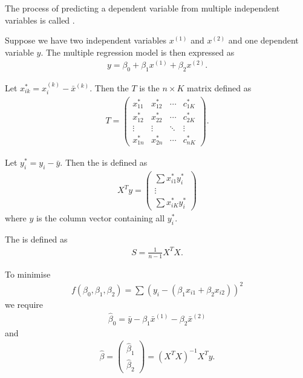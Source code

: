 \documentclass{article}
\begin{document}
\begin{definition}
	The process of predicting a dependent variable from multiple independent variables is called .
\end{definition}
\begin{definition}
	Suppose we have two independent variables $x^{(1)}$ and $x^{(2)}$ and one dependent variable $y$.
	The multiple regression model is then expressed as
	\begin{align*}
		y = \beta_0 + \beta_1 x^{(1)} + \beta_2 x^{(2)}.
	\end{align*}
\end{definition}
\begin{definition}
	Let $x^*_{ik}=x^{(k)}_i - \bar x^{(k)}$. Then the  $T$ is
	the $n\times K$ matrix defined as
	\begin{align*}
		T = \begin{pmatrix}
			x^*_{11} & x^*_{12} & \cdots & c^*_{1K}\\
			x^*_{12} & x^*_{22} & \cdots & c^*_{2K}\\
			\vdots & \vdots & \ddots & \vdots\\
			x^*_{1n} & x^*_{2n} &\cdots & c^*_{nK}
		\end{pmatrix}.
	\end{align*}
\end{definition}
\begin{definition}
	Let $y^*_i=y_i-\bar y$. Then the  is defined as
	\begin{align*}
		X^T y = \begin{pmatrix}
			\sum x^*_{i1} y^*_i\\
			\vdots\\
			\sum x^*_{iK} y^*_i
		\end{pmatrix}
	\end{align*}
	where $y$ is the column vector containing all $y^*_i$.	
\end{definition}
\begin{definition}
	The  is defined as
	\begin{align*}
		S =\frac{1}{n-1}X^T X.
	\end{align*}
\end{definition}
\begin{theorem}
	To minimise
	\begin{align*}
		f(\beta_0, \beta_1, \beta_2) = \sum (y_i - (\beta_1 x_{i1}+\beta_2 x_{i2}))^2
	\end{align*}
	we require
	\begin{align*}
		\hat\beta_0 = \bar y - \beta_1\bar x^{(1)} - \beta_2\bar x^{(2)}
	\end{align*}
	and
	\begin{align*}
		\hat\beta = \begin{pmatrix}
			\hat\beta_1\\
			\hat\beta_2
		\end{pmatrix}
		= (X^T X)^{-1}X^T y.
	\end{align*}
\end{theorem}
\end{document}
